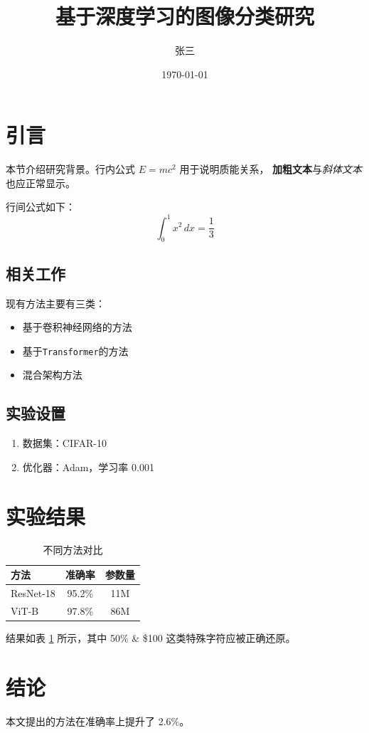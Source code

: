 \documentclass[12pt,a4paper]{article}
\title{基于深度学习的图像分类研究}
\author{张三}
\date{\today}
\begin{document}
\maketitle

\section{引言}
本节介绍研究背景。行内公式 $E = mc^2$ 用于说明质能关系，
\textbf{加粗文本}与\textit{斜体文本}也应正常显示。

行间公式如下：
\[
\int_{0}^{1} x^2 \, dx = \frac{1}{3}
\]

\subsection{相关工作}
现有方法主要有三类：

\begin{itemize}
  \item 基于卷积神经网络的方法
  \item 基于\texttt{Transformer}的方法
  \item 混合架构方法
\end{itemize}

\subsection{实验设置}

\begin{enumerate}
  \item 数据集：CIFAR-10
  \item 优化器：Adam，学习率 0.001
\end{enumerate}

\section{实验结果}

\begin{table}[htbp]
\centering
\begin{tabular}{lcc}
\toprule
方法 & 准确率 & 参数量 \\
\midrule
ResNet-18 & 95.2\% & 11M \\
ViT-B & 97.8\% & 86M \\
\bottomrule
\end{tabular}
\caption{不同方法对比}
\label{tab:cmp}
\end{table}

结果如表 \ref{tab:cmp} 所示，其中 50\% \& \$100 这类特殊字符应被正确还原。

\section{结论}
本文提出的方法在准确率上提升了 2.6\%。
\end{document}
